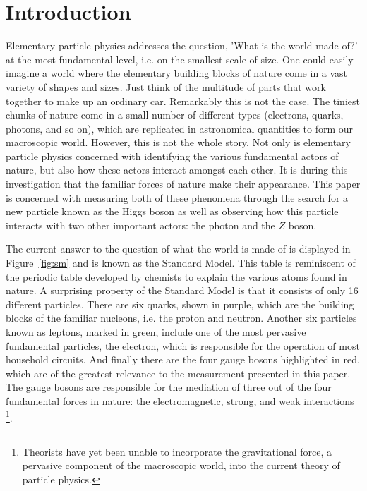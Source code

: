 
\section{Introduction} %





Elementary particle physics addresses the question, 'What is the world made of?' 
at the most fundamental level, i.e. on the smallest scale of size. 
One could easily imagine a world where the elementary building blocks of 
nature come in a vast variety of shapes and sizes. Just think of the multitude of 
parts that work together to make up an ordinary car. Remarkably this is not
the case. The tiniest chunks of nature come in a small number of different types
(electrons, quarks, photons, and so on), which are replicated in astronomical
quantities to form our macroscopic world. However, this is not the whole story.
Not only is elementary particle physics concerned with identifying the various 
fundamental actors of nature, but also how these actors interact amongst each other.
It is during this investigation that the familiar forces of nature make their
appearance. This paper is concerned with measuring both of these phenomena through 
the search for a new particle known as the Higgs boson as well as observing 
how this particle interacts with two other important actors: the photon and the 
$Z$ boson.

The current answer to the question of what the world is made of is displayed in 
Figure~\ref{fig:sm} and is known as the Standard Model. This table is reminiscent
of the periodic table developed by chemists to explain the various atoms
found in nature. A surprising property of the Standard Model is that it consists
of only 16 different particles. There are six quarks, shown in purple, which
are the building blocks of the familiar nucleons, i.e. the proton and neutron.
Another six particles known as leptons, marked in green, include one of
the most pervasive fundamental particles, the electron, 
which is responsible for the operation of most household circuits. And
finally there are the four gauge bosons highlighted in red, which are of the 
greatest relevance to the measurement presented in this paper.
The gauge bosons are responsible for the mediation of three 
out of the four fundamental forces in nature: the electromagnetic, strong, and 
weak interactions
\footnote{Theorists have yet been unable to incorporate the 
gravitational force, a pervasive component of the macroscopic world,
into the current theory of particle physics.}.

